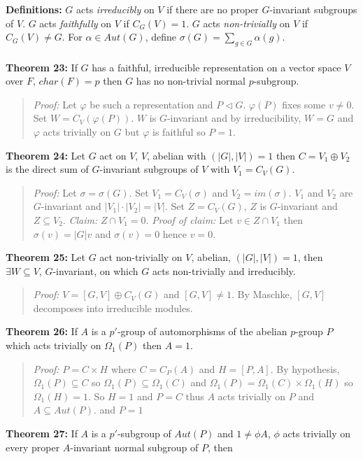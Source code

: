 {\bf Definitions:} $G$ acts \emph{irreducibly} on $V$  if there are no proper $G$-invariant
subgroups of $V$.  $G$ acts \emph{faithfully} on $V$ if $C_G(V) = 1$.
$G$ acts \emph{non-trivially} on $V$ if $C_G(V) \ne G$.
For $\alpha \in Aut(G)$, define $\sigma(G)= \sum_{g \in G} \alpha(g)$.
\\
\\
{\bf Theorem 23:}
If $G$ has a faithful, irreducible representation on a vector space $V$ over $F$,
$char(F) = p$ then $G$ has no non-trivial normal $p$-subgroup.
\begin{quote}
\emph{Proof:}  Let $\varphi$ be such a representation and $P \lhd G$.  $\varphi(P)$ fixes some
$v \ne 0$.  Set $W= C_V(\varphi(P))$.  $W$ is $G$-invariant and by irreducibility,
$W=G$ and $\varphi$ acts trivially on $G$ but $\varphi$ is faithful so
$P= 1$.
\end{quote}
{\bf Theorem 24:}
Let $G$ act on $V$, $V$, abelian with $(|G|, |V|)= 1$ then $C = V_1 \oplus V_2$ is the
direct sum of $G$-invariant subgroups of $V$ with $V_1= C_V(G)$.
\begin{quote}
\emph{Proof:}  Let $\sigma= \sigma(G)$.  Set $V_1 = C_V(\sigma)$ and $V_2= im(\sigma)$. $V_1$ and $V_2$ are $G$-invariant and $|V_1| \cdot |V_2| = |V|$.  Set $Z= C_V(G)$, $Z$ is $G$-invariant
and $Z \subseteq V_2$.   \emph{Claim:} $Z \cap V_1 = 0$.  \emph{Proof of claim:}
Let $v \in Z \cap V_1$ then $\sigma(v)= |G|v$ and $\sigma(v)= 0$ hence $v= 0$.
\end{quote}
{\bf Theorem 25:}
Let $G$ act non-trivially on $V$, abelian, $(|G|, |V|)=1$, then $\exists W \subseteq V$,
$G$-invariant, on which $G$ acts non-trivially and irreducibly.
\begin{quote}
\emph{Proof:}
$V= [G,V] \oplus C_V(G)$ and $[G,V] \ne 1$.  By Maschke, $[G,V]$ decomposes into
irreducible modules.
\end{quote}
{\bf Theorem 26:}
If $A$ is a $p'$-group of automorphisms of the abelian $p$-group $P$ which
acts trivially on $\Omega_1(P)$ then $A= 1$.
\begin{quote}
\emph{Proof:}  $P= C \times H$ where $C= C_P(A)$ and $H= [P, A]$.  By hypothesis,
$\Omega_1(P) \subseteq C$ so $\Omega_1(P) \subseteq \Omega_1(C)$ and
$\Omega_1(P) = \Omega_1(C) \times \Omega_1(H)$ so $\Omega_1(H) = 1$.
So $H = 1$ and $P= C$  thus $A$ acts trivially on $P$ and $A \subseteq Aut(P)$.
and $P = 1$
\end{quote}
{\bf Theorem 27:}
If $A$ is a $p'$-subgroup of $Aut(P)$ and $1 \ne \phi A$, $\phi$ acts trivially
on every proper $A$-invariant normal subgroup of $P$, then
